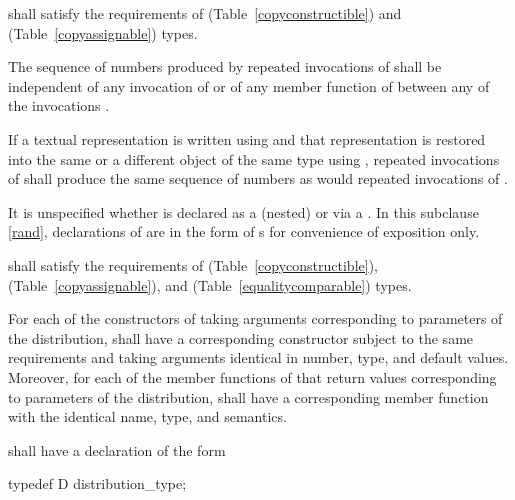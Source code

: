 \pnum
{} shall satisfy the requirements
of  (Table~\ref{copyconstructible})
and  (Table~\ref{copyassignable}) types.

\pnum
The sequence of numbers
produced by repeated invocations of 
shall be independent of any invocation of
or of
any  member function of 
between any of the invocations .

\pnum
If a textual representation is written using 
and that representation is restored
into the same or a different object 
of the same type using ,
repeated invocations of 
shall produce the same sequence of numbers
as would repeated invocations of .

\pnum
It is unspecified whether 
is declared as a (nested) 
or via a .
In this subclause \ref{rand},
declarations of 
are in the form of s
for convenience of exposition only.

\pnum
{} shall satisfy the requirements
of  (Table~\ref{copyconstructible}),
 (Table~\ref{copyassignable}),
and
 (Table~\ref{equalitycomparable}) types.

\pnum
For each of the constructors of 
taking arguments corresponding to parameters of the distribution,
 shall have a corresponding constructor
subject to the same requirements
and taking arguments identical in number, type, and default values.
Moreover,
for each of the member functions of 
that return values corresponding to parameters of the distribution,
 shall have a corresponding member function
with the identical name, type, and semantics.

\pnum
{} shall have a declaration of the form
\begin{codeblock}
typedef  D  distribution_type;
\end{codeblock}

%
%




